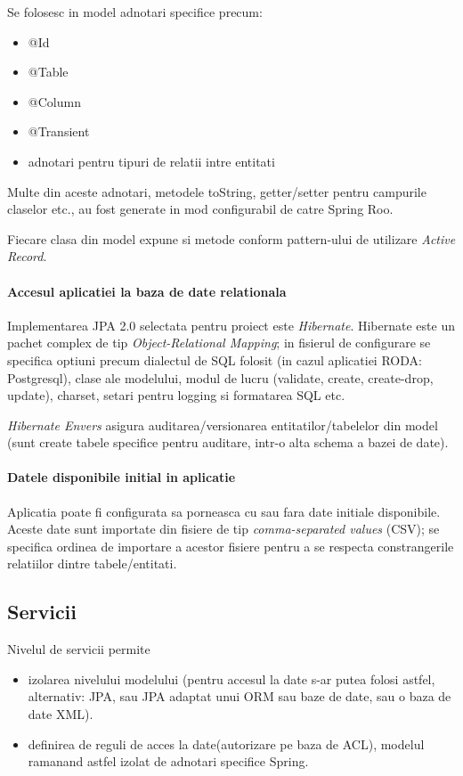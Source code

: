 Se folosesc in model adnotari specifice precum:
\begin{itemize}
  \item @Id
  \item @Table
  \item @Column
  \item @Transient
  \item adnotari pentru tipuri de relatii intre entitati %
\end{itemize}

Multe din aceste adnotari, metodele toString, 
getter/setter pentru campurile claselor etc., 
au fost generate in mod configurabil de catre Spring Roo.

Fiecare clasa din model expune si metode conform pattern-ului de utilizare \emph{Active Record}. 

\paragraph{Accesul aplicatiei la baza de date relationala}
Implementarea JPA 2.0 selectata pentru proiect este \emph{Hibernate}. 
Hibernate este un pachet complex de tip \emph{Object-Relational Mapping};
in fisierul de configurare se specifica optiuni precum dialectul de SQL folosit
(in cazul aplicatiei RODA: Postgresql), 
clase ale modelului, 
modul de lucru (validate, create, create-drop, update), 
charset, 
setari pentru logging si formatarea SQL etc.

\emph{Hibernate Envers} asigura auditarea/versionarea entitatilor/tabelelor din
model (sunt create tabele specifice pentru auditare, intr-o alta schema a bazei
de date).

\paragraph{Datele disponibile initial in aplicatie}
Aplicatia poate fi configurata sa porneasca cu sau fara date initiale
disponibile.
Aceste date sunt importate din fisiere de tip \emph{comma-separated values} (CSV); 
se specifica ordinea de importare a acestor fisiere pentru a se respecta constrangerile relatiilor
dintre tabele/entitati.

\subsection{Servicii}
Nivelul de servicii permite 
\begin{itemize}
\item 
izolarea nivelului modelului (pentru accesul la
date s-ar putea folosi astfel, alternativ: JPA, sau JPA adaptat unui ORM sau
baze de date, sau o baza de date XML).
\item
definirea de reguli de acces la date(autorizare pe baza de ACL), modelul
ramanand astfel izolat de adnotari specifice Spring.
\end{itemize} 

